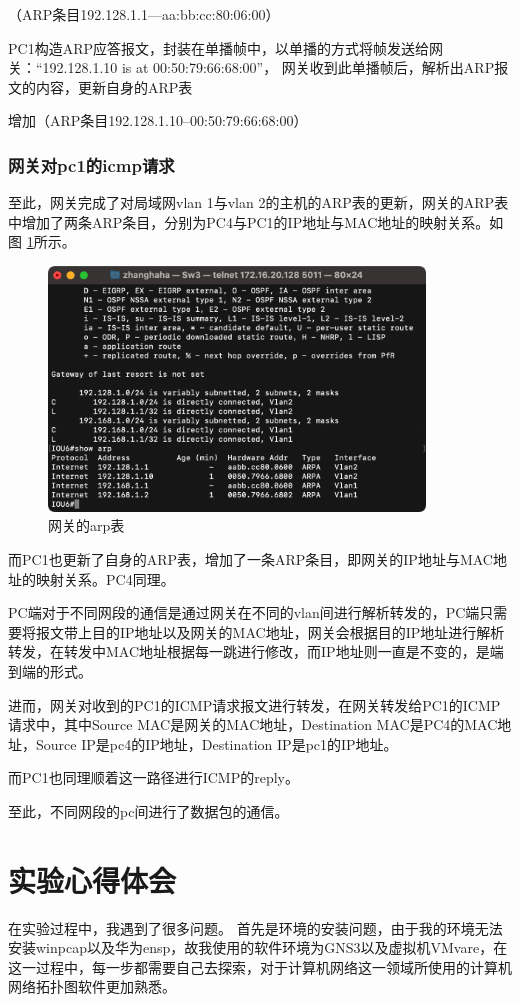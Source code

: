 \documentclass[a4paper,12pt]{report}
\begin{document}
\begin{spacing}{1.5}
（ARP条目192.128.1.1---aa:bb:cc:80:06:00）

PC1构造ARP应答报文，封装在单播帧中，以单播的方式将帧发送给网关：“192.128.1.10 is at 00:50:79:66:68:00”，
网关收到此单播帧后，解析出ARP报文的内容，更新自身的ARP表

增加（ARP条目192.128.1.10--00:50:79:66:68:00）

\subsubsection{网关对pc1的icmp请求}


至此，网关完成了对局域网vlan 1与vlan 2的主机的ARP表的更新，网关的ARP表中增加了两条ARP条目，分别为PC4与PC1的IP地址与MAC地址的映射关系。如图 \ref{arp}所示。
\begin{figure}[htb!]
  \centering
\includegraphics[width=10cm]{figure/sw3 arp.png}
\caption{网关的arp表}
\label{arp}
\end{figure}
而PC1也更新了自身的ARP表，增加了一条ARP条目，即网关的IP地址与MAC地址的映射关系。PC4同理。

PC端对于不同网段的通信是通过网关在不同的vlan间进行解析转发的，PC端只需要将报文带上目的IP地址以及网关的MAC地址，网关会根据目的IP地址进行解析转发，在转发中MAC地址根据每一跳进行修改，而IP地址则一直是不变的，是端到端的形式。

进而，网关对收到的PC1的ICMP请求报文进行转发，在网关转发给PC1的ICMP请求中，其中Source MAC是网关的MAC地址，Destination MAC是PC4的MAC地址，Source IP是pc4的IP地址，Destination IP是pc1的IP地址。

而PC1也同理顺着这一路径进行ICMP的reply。

至此，不同网段的pc间进行了数据包的通信。


\section{实验心得体会}
在实验过程中，我遇到了很多问题。
首先是环境的安装问题，由于我的环境无法安装winpcap以及华为ensp，故我使用的软件环境为GNS3以及虚拟机VMvare，在这一过程中，每一步都需要自己去探索，对于计算机网络这一领域所使用的计算机网络拓扑图软件更加熟悉。


\end{spacing}
\end{document}
